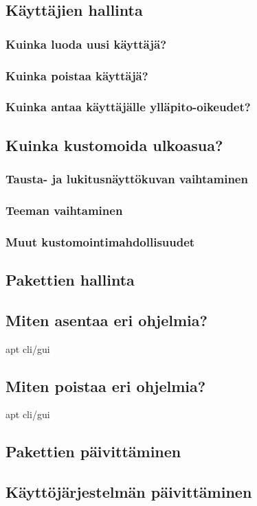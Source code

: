 \documentclass[a4paper, 12pt, finnish]{article}
\begin{document}
\subsection{Käyttäjien hallinta}

\subsubsection{Kuinka luoda uusi käyttäjä?}

\subsubsection{Kuinka poistaa käyttäjä?}

\subsubsection{Kuinka antaa käyttäjälle ylläpito-oikeudet?}

\subsection{Kuinka kustomoida ulkoasua?}

\subsubsection{Tausta- ja lukitusnäyttökuvan vaihtaminen}

\subsubsection{Teeman vaihtaminen}

\subsubsection{Muut kustomointimahdollisuudet}

\newpage
\subsection{Pakettien hallinta}

\subsection{Miten asentaa eri ohjelmia?}
apt cli/gui
\subsection{Miten poistaa eri ohjelmia?}
apt cli/gui
\subsection{Pakettien päivittäminen}

\subsection{Käyttöjärjestelmän päivittäminen}

\thispagestyle{empty}
\end{document}

